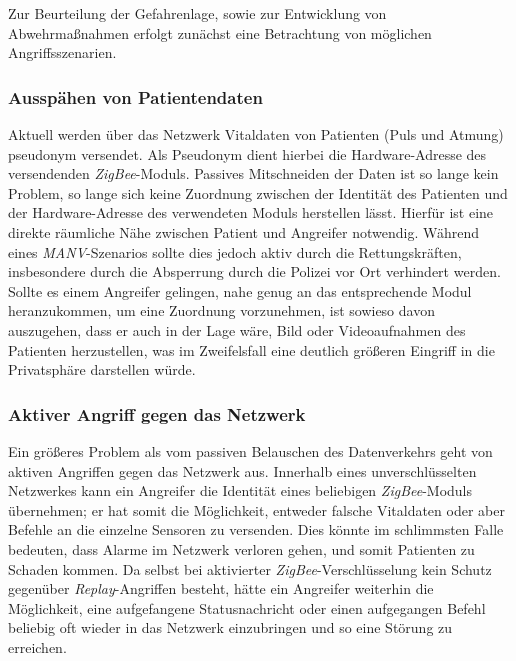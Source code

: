 Zur Beurteilung der Gefahrenlage, sowie zur Entwicklung von Abwehrmaßnahmen erfolgt zunächst eine Betrachtung von
möglichen Angriffsszenarien. 

\subsubsection{Ausspähen von Patientendaten}
Aktuell werden über das Netzwerk Vitaldaten von Patienten (Puls und Atmung) pseudonym versendet. Als Pseudonym dient 
hierbei die Hardware-Adresse des versendenden \emph{ZigBee}-Moduls. Passives Mitschneiden der Daten ist so lange kein Problem,
so lange sich keine Zuordnung zwischen der Identität des Patienten und der Hardware-Adresse des verwendeten Moduls
herstellen lässt. Hierfür ist eine direkte räumliche Nähe zwischen Patient und Angreifer notwendig. 
Während eines \emph{MANV}-Szenarios sollte dies jedoch aktiv durch die Rettungskräften, insbesondere durch die Absperrung 
durch die Polizei vor Ort verhindert werden. Sollte es einem Angreifer gelingen, nahe genug an das entsprechende Modul
heranzukommen, um eine Zuordnung vorzunehmen, ist sowieso davon auszugehen, dass er auch in der Lage wäre, Bild oder
Videoaufnahmen des Patienten herzustellen, was im Zweifelsfall eine deutlich größeren Eingriff in die Privatsphäre 
darstellen würde.

\subsubsection{Aktiver Angriff gegen das Netzwerk}
Ein größeres Problem als vom passiven Belauschen des Datenverkehrs geht von aktiven Angriffen gegen das Netzwerk
aus. Innerhalb eines unverschlüsselten Netzwerkes kann ein Angreifer die Identität eines beliebigen \emph{ZigBee}-Moduls 
übernehmen; er hat somit die Möglichkeit, entweder falsche Vitaldaten oder aber Befehle an die einzelne Sensoren zu
versenden. Dies könnte im schlimmsten Falle bedeuten, dass Alarme im Netzwerk verloren gehen, und somit Patienten
zu Schaden kommen. Da selbst bei aktivierter \emph{ZigBee}-Verschlüsselung kein Schutz gegenüber 
\emph{Replay}-Angriffen besteht, hätte
ein Angreifer weiterhin die Möglichkeit, eine aufgefangene Statusnachricht oder einen aufgegangen Befehl beliebig oft
wieder in das Netzwerk einzubringen und so eine Störung zu erreichen.

